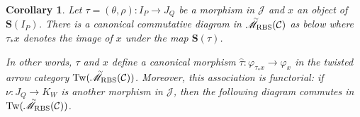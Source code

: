 \documentclass[12pt, reqno]{amsart}
\theoremstyle{plain}
\newtheorem{corollary}[theorem]{Corollary}
\theoremstyle{definition}
\renewcommand{\phi}{\varphi}
\begin{document}
\begin{corollary}\label{morphism in twisted arrow category}
Let $\tau=(\theta,\rho)\colon I_P\rightarrow J_Q$ be a morphism in $\mathcal{J}$ and $x$ an object of $\mathbf{S}(I_P)$. There is a canonical commutative diagram in $\accentset{\sim}{\mathscr{M}}_{\operatorname{RBS}}(\mathcal{C})$ as below where $\tau_*x$ denotes the image of $x$ under the map $\mathbf{S}(\tau)$.
\begin{center}
\end{center}
In other words, $\tau$ and $x$ define a canonical morphism $\hat{\tau}\colon \phi_{\tau_*x}\rightarrow\phi_x$ in the twisted arrow category $\operatorname{Tw}(\accentset{\sim}{\mathscr{M}}_{\operatorname{RBS}}(\mathcal{C}))$. Moreover, this association is functorial: if $\nu\colon J_Q\rightarrow K_W$ is another morphism in $\mathcal{J}$, then the following diagram commutes in $\operatorname{Tw}(\accentset{\sim}{\mathscr{M}}_{\operatorname{RBS}}(\mathcal{C}))$.
\begin{center}
\end{center}
\end{corollary}
\end{document}
